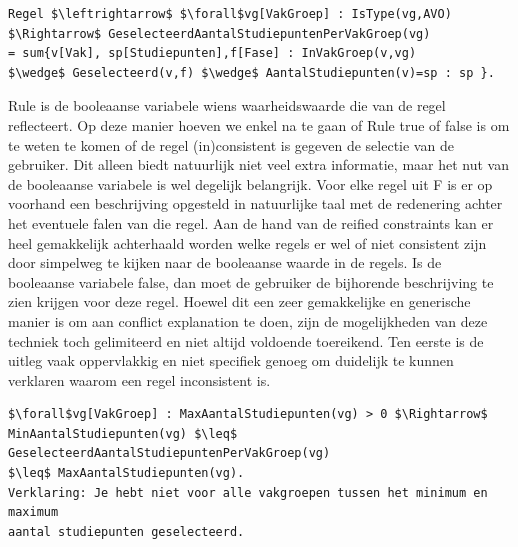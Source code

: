 \lstset{basicstyle=\scriptsize}
\begin{lstlisting}[mathescape, caption=IDP Reified Constraint Example, frame=single]
Regel $\leftrightarrow$ $\forall$vg[VakGroep] : IsType(vg,AVO) $\Rightarrow$ GeselecteerdAantalStudiepuntenPerVakGroep(vg) 
= sum{v[Vak], sp[Studiepunten],f[Fase] : InVakGroep(v,vg) 
$\wedge$ Geselecteerd(v,f) $\wedge$ AantalStudiepunten(v)=sp : sp }.
\end{lstlisting}
Rule is de booleaanse variabele wiens waarheidswaarde die van de regel reflecteert. Op deze manier hoeven we enkel na te gaan of Rule true of false is om te weten te komen of de regel (in)consistent is gegeven de selectie van de gebruiker. Dit alleen biedt natuurlijk niet veel extra informatie, maar het nut van de booleaanse variabele is wel degelijk belangrijk. Voor elke regel uit F is er op voorhand een beschrijving opgesteld in natuurlijke taal met de redenering achter het eventuele falen van die regel. Aan de hand van de reified constraints kan er heel gemakkelijk achterhaald worden welke regels er wel of niet consistent zijn door simpelweg te kijken naar de booleaanse waarde in de regels. Is de booleaanse variabele false, dan moet de gebruiker de bijhorende beschrijving te zien krijgen voor deze regel. Hoewel dit een zeer gemakkelijke en generische manier is om aan conflict explanation te doen, zijn de mogelijkheden van deze techniek toch gelimiteerd en niet altijd voldoende toereikend. Ten eerste is de uitleg vaak oppervlakkig en niet specifiek genoeg om duidelijk te kunnen verklaren waarom een regel inconsistent is. 
\lstset{basicstyle=\scriptsize}
\begin{lstlisting}[mathescape, caption=Reified constraint Shortcomings, frame=single]
$\forall$vg[VakGroep] : MaxAantalStudiepunten(vg) > 0 $\Rightarrow$ 
MinAantalStudiepunten(vg) $\leq$ GeselecteerdAantalStudiepuntenPerVakGroep(vg) 
$\leq$ MaxAantalStudiepunten(vg).
Verklaring: Je hebt niet voor alle vakgroepen tussen het minimum en maximum 
aantal studiepunten geselecteerd.
\end{lstlisting}
